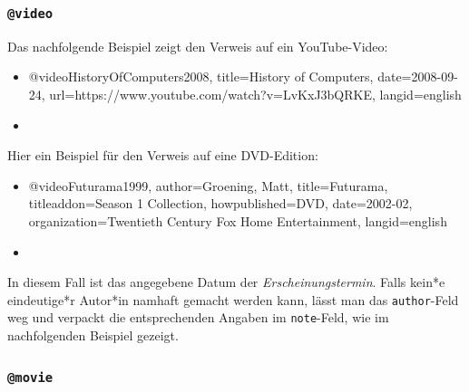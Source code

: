 \subsubsection{\texttt{\bfseries @video}}
\label{sec:@video}

Das nachfolgende Beispiel zeigt den Verweis auf ein YouTube-Video:
%
\begin{itemize}
\item[]
\begin{GenericCode}[numbers=none]
@video{HistoryOfComputers2008,
  title={History of Computers},
  date={2008-09-24},
  url={https://www.youtube.com/watch?v=LvKxJ3bQRKE},
  langid={english}
}
\end{GenericCode}
\item[\cite{HistoryOfComputers2008}] 
\end{itemize}

\noindent
Hier ein Beispiel für den Verweis auf eine DVD-Edition:
%
\begin{itemize}
\item[]
\begin{GenericCode}[numbers=none]
@video{Futurama1999,
  author={Groening, Matt},
  title={Futurama},
  titleaddon={Season 1 Collection},
  howpublished={DVD},
  date={2002-02},
  organization={Twentieth Century Fox Home Entertainment},
  langid={english}
}
\end{GenericCode}
\item[\cite{Futurama1999}] 
\end{itemize}
%
In diesem Fall ist das angegebene Datum der \emph{Erscheinungstermin}. Falls
kein*e eindeutige*r Autor*in namhaft gemacht werden kann, lässt man das
\texttt{author}-Feld weg und verpackt die entsprechenden Angaben im
\texttt{note}-Feld, wie im nachfolgenden Beispiel gezeigt.

\subsubsection{\texttt{\bfseries @movie}}
\label{sec:@movie}

